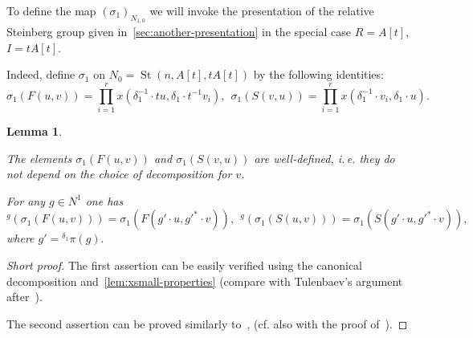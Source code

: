 \documentclass[oneside, 10pt]{amsart}
\DeclareMathOperator{\St}{St}
\numberwithin{equation}{section}
\newtheorem{lemma}{Lemma}
\numberwithin{lemma}{section}
\theoremstyle{definition}
\theoremstyle{remark}
\begin{document}

To define the map $(\sigma_1)_{N_{1,0}}$ we will invoke the presentation of the relative Steinberg group given in~\cref{sec:another-presentation}
in the special case $R=A[t]$, $I=tA[t]$.


Indeed, define $\sigma_1$ on $N_{0}=\St(n, A[t], tA[t])$ by the following identities: 
\begin{equation}
 \sigma_1(F(u, v)) = \prod\limits_{i=1}^r x(\delta_1^{-1} \cdot t u, \delta_1 \cdot t^{-1} v_i),\ \
 \sigma_1(S(v, u)) = \prod\limits_{i=1}^r x(\delta_1^{-1} \cdot v_i, \delta_1 \cdot u).
\end{equation}


\begin{lemma} \label{lem:cor-conj}
 \begin{lemlist}
   \item \label{item:correctness} The elements $\sigma_1(F(u, v))$ and $\sigma_1(S(v, u))$ are well-defined, i.\,e. they do not depend on the choice of decomposition for $v$.
   \item \label{item:conjugation} For any $g \in N^1$ one has 
      \begin{equation}
          \nonumber {}^g\left(\sigma_1(F(u, v))\right) = \sigma_1\left(F(g' \cdot u, {g'}^{*} \cdot v)\right),\ \ 
                    {}^g\left(\sigma_1(S(u, v))\right) = \sigma_1\left(S(g' \cdot u, {g'}^{*} \cdot v)\right),                    
      \end{equation}
      where $g' = {}^{\delta_1}\pi(g).$
 \end{lemlist}
\end{lemma}
\begin{proof}[Short proof]
 The first assertion can be easily verified using the canonical decomposition and~\cref{lem:xsmall-properties}
  (compare with Tulenbaev's argument after~\cite[Lemma~1.1]{Tu83}).
  
 The second assertion can be proved similarly to~\cite[3.14]{Ka77}, (cf. also with the proof of~\cite[Lemma~4.4d]{LS17}).
\end{proof}
\end{document}
